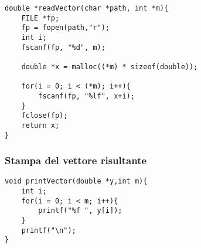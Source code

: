 \begin{lstlisting}
double *readVector(char *path, int *m){
    FILE *fp;
    fp = fopen(path,"r");
    int i;
    fscanf(fp, "%d", m);

    double *x = malloc((*m) * sizeof(double));

    for(i = 0; i < (*m); i++){
        fscanf(fp, "%lf", x+i);
    }
    fclose(fp);
    return x;
}
\end{lstlisting}

\subsubsection{Stampa del vettore risultante}
\begin{lstlisting}
void printVector(double *y,int m){
    int i;
    for(i = 0; i < m; i++){
        printf("%f ", y[i]);
    }
    printf("\n");
}
\end{lstlisting}